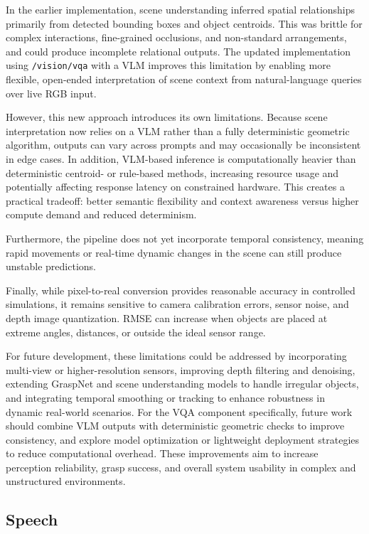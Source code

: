 \documentclass[12pt]{extarticle}
\begin{document}
In the earlier implementation, scene understanding inferred spatial relationships primarily from detected bounding boxes and object centroids. This was brittle for complex interactions, fine-grained occlusions, and non-standard arrangements, and could produce incomplete relational outputs. The updated implementation using \texttt{/vision/vqa} with a VLM improves this limitation by enabling more flexible, open-ended interpretation of scene context from natural-language queries over live RGB input.

However, this new approach introduces its own limitations. Because scene interpretation now relies on a VLM rather than a fully deterministic geometric algorithm, outputs can vary across prompts and may occasionally be inconsistent in edge cases. In addition, VLM-based inference is computationally heavier than deterministic centroid- or rule-based methods, increasing resource usage and potentially affecting response latency on constrained hardware. This creates a practical tradeoff: better semantic flexibility and context awareness versus higher compute demand and reduced determinism.

Furthermore, the pipeline does not yet incorporate temporal consistency, meaning rapid movements or real-time dynamic changes in the scene can still produce unstable predictions. 

Finally, while pixel-to-real conversion provides reasonable accuracy in controlled simulations, it remains sensitive to camera calibration errors, sensor noise, and depth image quantization. RMSE can increase when objects are placed at extreme angles, distances, or outside the ideal sensor range. 

For future development, these limitations could be addressed by incorporating multi-view or higher-resolution sensors, improving depth filtering and denoising, extending GraspNet and scene understanding models to handle irregular objects, and integrating temporal smoothing or tracking to enhance robustness in dynamic real-world scenarios. For the VQA component specifically, future work should combine VLM outputs with deterministic geometric checks to improve consistency, and explore model optimization or lightweight deployment strategies to reduce computational overhead. These improvements aim to increase perception reliability, grasp success, and overall system usability in complex and unstructured environments.

\subsection{Speech}
\end{document}
